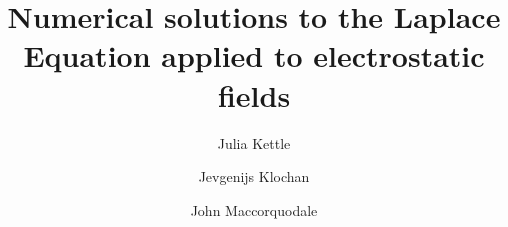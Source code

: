 \documentclass[aps,twocolumn,pre,nofootinbib,10pt]{revtex4-1}
\begin{document}

\newcommand{\breite}{1.0} %


\newtheorem{prop}{Proposition}
\newtheorem{cor}{Corollary}

\newcommand{\be}{\begin{equation}}
\newcommand{\ee}{\end{equation}}

\newcommand{\bea}{\begin{eqnarray}}
\newcommand{\eea}{\end{eqnarray}}

\newcommand{\Reals}{\mathbb{R}}     %
\newcommand{\Int}{\mathbb{Z}}       %
\newcommand{\Com}{\mathbb{C}}       %
\newcommand{\Nat}{\mathbb{N}}       %


\newcommand{\id}{\mathbbm{1}}    

\newcommand{\Real}{\mathop{\mathrm{Re}}}
\newcommand{\Imag}{\mathop{\mathrm{Im}}}

\def\O{\mbox{$\mathcal{O}$}}    
\def\F{\mathcal{F}}			
\def\sgn{\text{sgn}}

\newcommand{\dw}{\ensuremath{\Delta}} %
\newcommand{\wbp}{\ensuremath{\omega_0}}
\newcommand{\dv}{\ensuremath{\delta}}
\newcommand{\vbp}{\ensuremath{\nu_0}}
\newcommand{\vplus}{\ensuremath{\nu_{+}}}
\newcommand{\vminus}{\ensuremath{\nu_{-}}}
\newcommand{\wplus}{\ensuremath{\omega_{+}}}
\newcommand{\wminus}{\ensuremath{\omega_{-}}}
\newcommand{\den}{\ensuremath{\rho}}
\newcommand{\del}{\ensuremath{\nabla}}
\newcommand{\per}{\ensuremath{\epsilon_0}}
\newcommand{\pot}{\ensuremath{\phi}}
\newcommand*\Let[2]{\State #1 $\gets$ #2}









\title{Numerical solutions to the Laplace Equation applied to electrostatic fields}



\author{Julia Kettle}

\author{Jevgenijs Klochan}

\author{John Maccorquodale}
\end{document}
